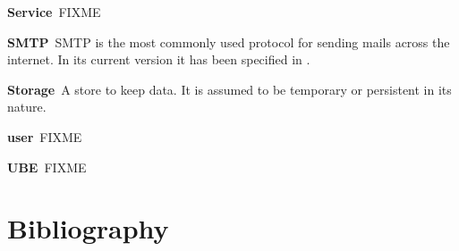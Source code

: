 \documentclass[10pt,a4paper,appendixprefix,twocolumn,draft]{scrbook}
\newenvironment{entry}{\par\leavevmode\hangpara{1.5mm}{1}\ignorespaces}{\RaggedRight\par}
\newcommand*{\mainentry}[2]{{\bfseries{#1\label{def:#1}}}~#2\par}
\begin{document}
\begin{entry}
  \mainentry{Service}{FIXME}
\end{entry}

\begin{entry}
  \mainentry{SMTP}{SMTP is the most commonly used protocol for sending mails across the internet. In its current version it has been specified in \cite{RFC5321}.}
\end{entry}

\begin{entry}
  \mainentry{Storage}{A store to keep data. It is assumed to be temporary or persistent in its nature.}
\end{entry}

\begin{entry}
  \mainentry{user}{FIXME}
\end{entry}

\begin{entry}
  \mainentry{UBE}{FIXME}
\end{entry}

\chapter{Bibliography}
{
  \renewcommand*{\bibfont}{\small}
  \printbibliography[title={},heading=none]
}


\printindex

\begin{comment}


\end{comment}



\begin{comment}
http://www.rfc-editor.org/pubprocess.html
RFC2223 Instructions to RFC Authors
RFC2119 BCP14 Key words for use in RFCs to Indicate Requirement Levels
RFC3979 BCP79 Intellectual Property Rights in IETF Technology
RFC5378 BCP78 Rights Contributors Provide to the IETF Trust


http://tex.stackexchange.com/questions/36307/formatting-back-references-in-bibliography
http://www.cs.columbia.edu/irt/software/l2x/ l2x -- conversion from LaTeX to other formats Version 1.13
http://ftp.gwdg.de/pub/ctan/support/l2x/
http://tools.ietf.org/tools/xml2rfc2

http://www.zisc.ethz.ch/events/2003-2011/ISC2006Slides/FederrathZISCTalk.pdf

Professorliste
Dr. Christoph Sprenger (Part I)
-Prof. David Basin
Gregory Demay
Peter Gazi
Dr. Srdjan Marinovic
Dr. Sasa Radomirovic
Dr. Ralf Sasse

T. Hoefler
A. Perrig 
-Dr. Jan Camenisch (Keine Berechtigung)

-Srdjan Capkun (Keine Kapazität)
-David Basin  (Keine Kapazität)
\end{comment}
\end{document}
